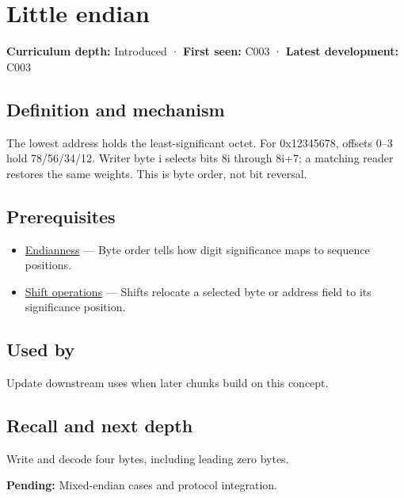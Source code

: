 \hypertarget{appendix-367b6abf460e}{}
\section{Little endian}\label{appendix-367b6abf460e-little-endian}

\textbf{Curriculum depth:} Introduced · \textbf{First seen:} C003 · \textbf{Latest development:} C003

\subsection{Definition and mechanism}\label{appendix-367b6abf460e-definition-and-mechanism}

The lowest address holds the least-significant octet. For 0x12345678, offsets 0--3 hold 78/56/34/12. Writer byte i selects bits 8i through 8i+7; a matching reader restores the same weights. This is byte order, not bit reversal.

\subsection{Prerequisites}\label{appendix-367b6abf460e-prerequisites}

\begin{itemize}
\tightlist
\item
  \hyperref[appendix-bc07c3d25b18]{Endianness} --- Byte order tells how digit significance maps to sequence positions.
\item
  \hyperref[appendix-73425b25118e]{Shift operations} --- Shifts relocate a selected byte or address field to its significance position.
\end{itemize}

\subsection{Used by}\label{appendix-367b6abf460e-used-by}

Update downstream uses when later chunks build on this concept.

\subsection{Recall and next depth}\label{appendix-367b6abf460e-recall-and-next-depth}

Write and decode four bytes, including leading zero bytes.

\textbf{Pending:} Mixed-endian cases and protocol integration.

